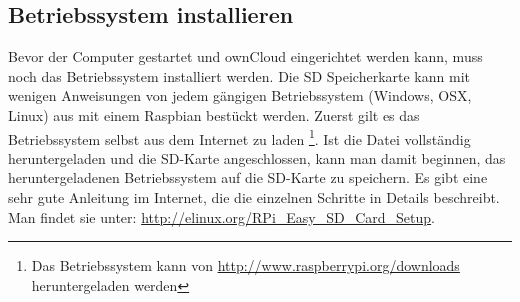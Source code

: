 \subsection{Betriebssystem installieren}
Bevor der Computer gestartet und ownCloud eingerichtet werden kann, muss noch das Betriebssystem installiert werden. 
Die SD Speicherkarte kann mit wenigen Anweisungen von jedem gängigen Betriebssystem (Windows, OSX, Linux) aus mit einem Raspbian bestückt werden.
Zuerst gilt es das Betriebssystem selbst aus dem Internet zu laden
\footnote{Das Betriebssystem kann von \url{http://www.raspberrypi.org/downloads} heruntergeladen werden}.
Ist die Datei vollständig heruntergeladen und die SD-Karte angeschlossen, kann man damit beginnen, das heruntergeladenen Betriebssystem auf die SD-Karte zu speichern.
Es gibt eine sehr gute Anleitung im Internet, die die einzelnen Schritte in Details beschreibt. Man findet sie unter: \url{http://elinux.org/RPi\_Easy\_SD\_Card\_Setup}.
